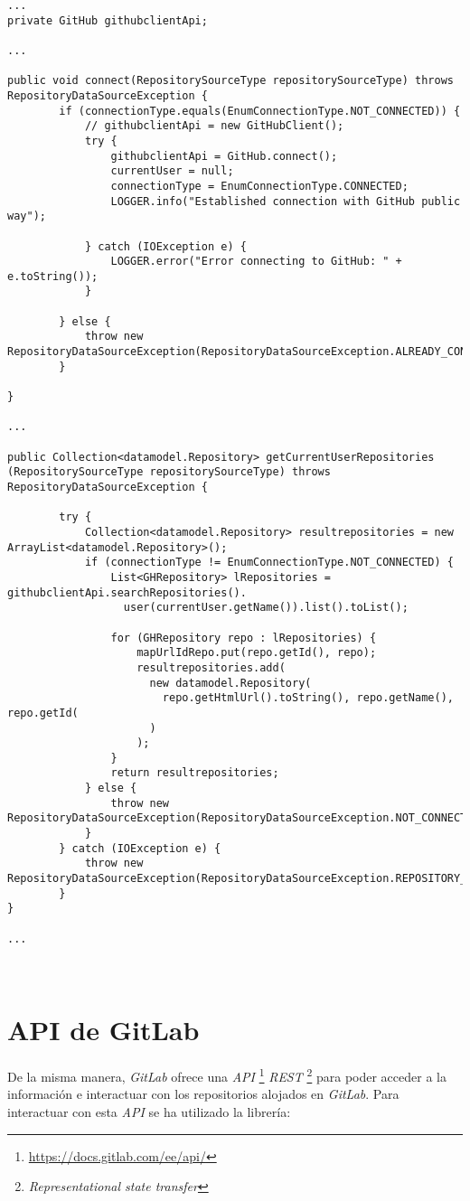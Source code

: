 \begin{minipage}{\linewidth}
{\tiny
\begin{verbatim}
...
private GitHub githubclientApi;

...

public void connect(RepositorySourceType repositorySourceType) throws RepositoryDataSourceException {
		if (connectionType.equals(EnumConnectionType.NOT_CONNECTED)) {
			// githubclientApi = new GitHubClient();
			try {
				githubclientApi = GitHub.connect();
				currentUser = null;
				connectionType = EnumConnectionType.CONNECTED;
				LOGGER.info("Established connection with GitHub public way");

			} catch (IOException e) {
				LOGGER.error("Error connecting to GitHub: " + e.toString());
			}

		} else {
			throw new RepositoryDataSourceException(RepositoryDataSourceException.ALREADY_CONNECTED);
		}

}

...

public Collection<datamodel.Repository> getCurrentUserRepositories
(RepositorySourceType repositorySourceType)	throws RepositoryDataSourceException {

		try {
			Collection<datamodel.Repository> resultrepositories = new ArrayList<datamodel.Repository>();
			if (connectionType != EnumConnectionType.NOT_CONNECTED) {
				List<GHRepository> lRepositories = githubclientApi.searchRepositories().
				  user(currentUser.getName()).list().toList();

				for (GHRepository repo : lRepositories) {
					mapUrlIdRepo.put(repo.getId(), repo);
					resultrepositories.add(
					  new datamodel.Repository(
					    repo.getHtmlUrl().toString(), repo.getName(), repo.getId(
					  )
					);
				}
				return resultrepositories;
			} else {
				throw new RepositoryDataSourceException(RepositoryDataSourceException.NOT_CONNECTED);
			}
		} catch (IOException e) {
			throw new RepositoryDataSourceException(RepositoryDataSourceException.REPOSITORY_NOT_FOUND);
		}
}

...
\end{verbatim}
}
\end{minipage}\\

\newpage
\section{API de GitLab}

De la misma manera, \textit{GitLab} ofrece una \textit{API} \footnote{\url{https://docs.gitlab.com/ee/api/}} \textit{REST} \footnote{\textit{Representational state transfer}} para poder acceder a la información e interactuar con los repositorios alojados en \textit{GitLab}. Para interactuar con esta \textit{API} se ha utilizado la librería:\\

